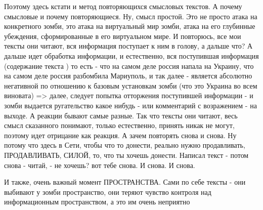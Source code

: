 Поэтому здесь кстати и метод повторяющихся смысловых текстов. А почему
смысловые и почему повторяющиеся. Ну, смысл простой. Это не просто атака на
конкретного зомби, это атака на виртуальный мир зомби, атака на его глубинные
убеждения, сформированные в его виртуальном мире. И повторюсь, все мои тексты
они читают, вся информация поступает к ним в голову, а дальше что? А дальше
идет обработка информации, и естественно, вся поступившая информация
(содержание текста ) то есть - что на самом деле россия напала на Украину, что
на самом деле россия разбомбила Мариуполь, и так далее - является абсолютно
негативной по отношению к базовым установкам зомби (что это Украина во всем
виновата) => далее, следует попытка отторжения поступившей информации - и зомби
выдается ругательство какое нибудь - или комментарий с возражением - на выходе.
А реакции бывают самые разные. Так что тексты они читают, весь смысл сказанного
понимают, только естественно, принять никак не могут, поэтому идет отрицание
как реакция. А зачем повторять снова и снова. Ну потому что здесь в Сети, чтобы
что то донести, реально нужно продавливать, ПРОДАВЛИВАТЬ, СИЛОЙ, то, что ты
хочешь донести. Написал текст - потом снова - читай, - не хочешь? вот тебе
снова. И снова. И снова.

И также, очень важный момент ПРОСТРАНСТВА. Сами по себе тексты - они выбивают у
зомби пространство, они теряют чувство контроля над информационным
пространством, а это им очень неприятно
